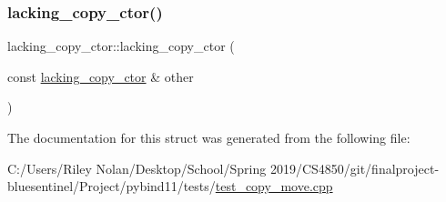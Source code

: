 \mbox{\label{structlacking__copy__ctor_a4b177fa9a0bf30531f2ed0c11a0c033a}} 
\subsubsection{\texorpdfstring{lacking\_copy\_ctor()}{lacking\_copy\_ctor()}\hspace{0.1cm}{\footnotesize\ttfamily [2/2]}}
{\footnotesize\ttfamily lacking\+\_\+copy\+\_\+ctor\+::lacking\+\_\+copy\+\_\+ctor (\begin{DoxyParamCaption}\item[{const \mbox{\hyperlink{structlacking__copy__ctor}{lacking\+\_\+copy\+\_\+ctor}} \&}]{other }\end{DoxyParamCaption})\hspace{0.3cm}{\ttfamily [delete]}}



The documentation for this struct was generated from the following file\+:\begin{DoxyCompactItemize}
\item 
C\+:/\+Users/\+Riley Nolan/\+Desktop/\+School/\+Spring 2019/\+C\+S4850/git/finalproject-\/bluesentinel/\+Project/pybind11/tests/\mbox{\hyperlink{test__copy__move_8cpp}{test\+\_\+copy\+\_\+move.\+cpp}}\end{DoxyCompactItemize}
